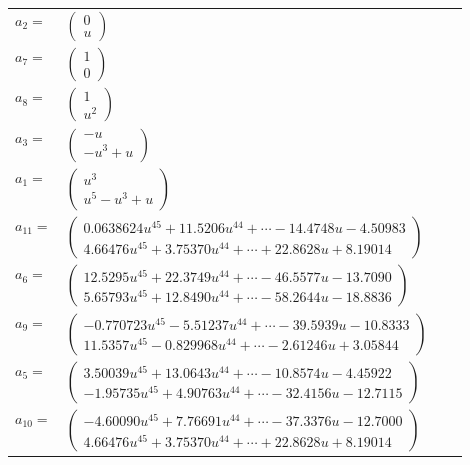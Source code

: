 \documentclass[1p]{elsarticle_modified}
\theoremstyle{definition}
\begin{document}
\begin{tabular}{m{7pt} m{180pt} m{7pt} m{180pt} }
\flushright $a_{2}=$&$\begin{pmatrix}0\\u\end{pmatrix}$ \\
\flushright $a_{7}=$&$\begin{pmatrix}1\\0\end{pmatrix}$ \\
\flushright $a_{8}=$&$\begin{pmatrix}1\\u^2\end{pmatrix}$ \\
\flushright $a_{3}=$&$\begin{pmatrix}- u\\- u^3+u\end{pmatrix}$ \\
\flushright $a_{1}=$&$\begin{pmatrix}u^3\\u^5- u^3+u\end{pmatrix}$ \\
\flushright $a_{11}=$&$\begin{pmatrix}0.0638624 u^{45}+11.5206 u^{44}+\cdots-14.4748 u-4.50983\\4.66476 u^{45}+3.75370 u^{44}+\cdots+22.8628 u+8.19014\end{pmatrix}$ \\
\flushright $a_{6}=$&$\begin{pmatrix}12.5295 u^{45}+22.3749 u^{44}+\cdots-46.5577 u-13.7090\\5.65793 u^{45}+12.8490 u^{44}+\cdots-58.2644 u-18.8836\end{pmatrix}$ \\
\flushright $a_{9}=$&$\begin{pmatrix}-0.770723 u^{45}-5.51237 u^{44}+\cdots-39.5939 u-10.8333\\11.5357 u^{45}-0.829968 u^{44}+\cdots-2.61246 u+3.05844\end{pmatrix}$ \\
\flushright $a_{5}=$&$\begin{pmatrix}3.50039 u^{45}+13.0643 u^{44}+\cdots-10.8574 u-4.45922\\-1.95735 u^{45}+4.90763 u^{44}+\cdots-32.4156 u-12.7115\end{pmatrix}$ \\
\flushright $a_{10}=$&$\begin{pmatrix}-4.60090 u^{45}+7.76691 u^{44}+\cdots-37.3376 u-12.7000\\4.66476 u^{45}+3.75370 u^{44}+\cdots+22.8628 u+8.19014\end{pmatrix}$ \\

\end{tabular}
\end{document}
